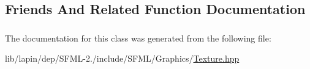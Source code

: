 \subsection{Friends And Related Function Documentation}
\hypertarget{classsf_1_1_texture_a564c389faf3e8638c546c12cdbdda81d}{
\subsubsection[{Render\-Target}]{\hspace{0.3cm}{\ttfamily [friend]}}}\label{classsf_1_1_texture_a564c389faf3e8638c546c12cdbdda81d}
\hypertarget{classsf_1_1_texture_a96c222b24c6d9ddbc3666f7981622156}{
\subsubsection[{Render\-Texture}]{\hspace{0.3cm}{\ttfamily [friend]}}}\label{classsf_1_1_texture_a96c222b24c6d9ddbc3666f7981622156}


The documentation for this class was generated from the following file\-:\begin{DoxyCompactItemize}
\item 
lib/lapin/dep/\-S\-F\-M\-L-\/2./include/\-S\-F\-M\-L/\-Graphics/\hyperlink{lapin_2dep_2_s_f_m_l-2_83_2include_2_s_f_m_l_2_graphics_2_texture_8hpp}{Texture.\-hpp}\end{DoxyCompactItemize}
